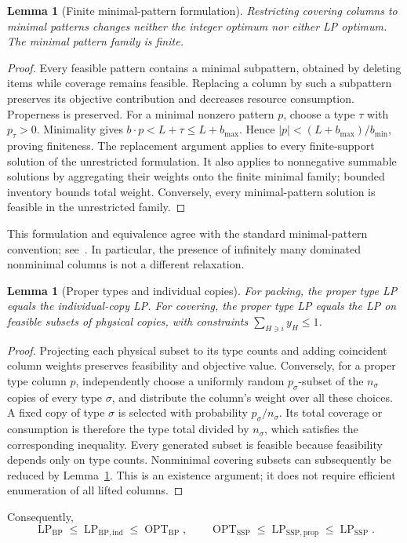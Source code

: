 \documentclass[11pt,a4paper]{article}
\newtheorem{lemma}[theorem]{Lemma}
\theoremstyle{definition}
\theoremstyle{remark}
\newcommand{\BP}{\mathrm{BP}}
\newcommand{\SSP}{\mathrm{SSP}}
\newcommand{\OPT}{\operatorname{OPT}}
\newcommand{\LP}{\operatorname{LP}}
\begin{document}
\begin{lemma}[Finite minimal-pattern formulation]\label{lem:minimal}
Restricting covering columns to minimal patterns changes neither the integer optimum nor either LP optimum. The minimal pattern family is finite.
\end{lemma}
\begin{proof}
Every feasible pattern contains a minimal subpattern, obtained by deleting items while coverage remains feasible. Replacing a column by such a subpattern preserves its objective contribution and decreases resource consumption. Properness is preserved. For a minimal nonzero pattern $p$, choose a type $\tau$ with $p_\tau>0$. Minimality gives $b\cdot p<L+\tau\le L+b_{\max}$. Hence $|p|<(L+b_{\max})/b_{\min}$, proving finiteness. The replacement argument applies to every finite-support solution of the unrestricted formulation. It also applies to nonnegative summable solutions by aggregating their weights onto the finite minimal family; bounded inventory bounds total weight. Conversely, every minimal-pattern solution is feasible in the unrestricted family.
\end{proof}
This formulation and equivalence agree with the standard minimal-pattern convention; see~\cite[Section~2]{MS19}. In particular, the presence of infinitely many dominated nonminimal columns is not a different relaxation.

\begin{lemma}[Proper types and individual copies]\label{lem:lifting}
For packing, the proper type LP equals the individual-copy LP. For covering, the proper type LP equals the LP on feasible subsets of physical copies, with constraints $\sum_{H\ni i}y_H\le1$.
\end{lemma}
\begin{proof}
Projecting each physical subset to its type counts and adding coincident column weights preserves feasibility and objective value. Conversely, for a proper type column $p$, independently choose a uniformly random $p_\sigma$-subset of the $n_\sigma$ copies of every type $\sigma$, and distribute the column's weight over all these choices. A fixed copy of type $\sigma$ is selected with probability $p_\sigma/n_\sigma$. Its total coverage or consumption is therefore the type total divided by $n_\sigma$, which satisfies the corresponding inequality. Every generated subset is feasible because feasibility depends only on type counts. Nonminimal covering subsets can subsequently be reduced by Lemma~\ref{lem:minimal}. This is an existence argument; it does not require efficient enumeration of all lifted columns.
\end{proof}
Consequently,
\[
 \LP_{\BP}\le\LP_{\BP,\mathrm{ind}}\le\OPT_{\BP},
 \qquad
 \OPT_{\SSP}\le\LP_{\SSP,\mathrm{prop}}\le\LP_{\SSP}.
\]
\end{document}
